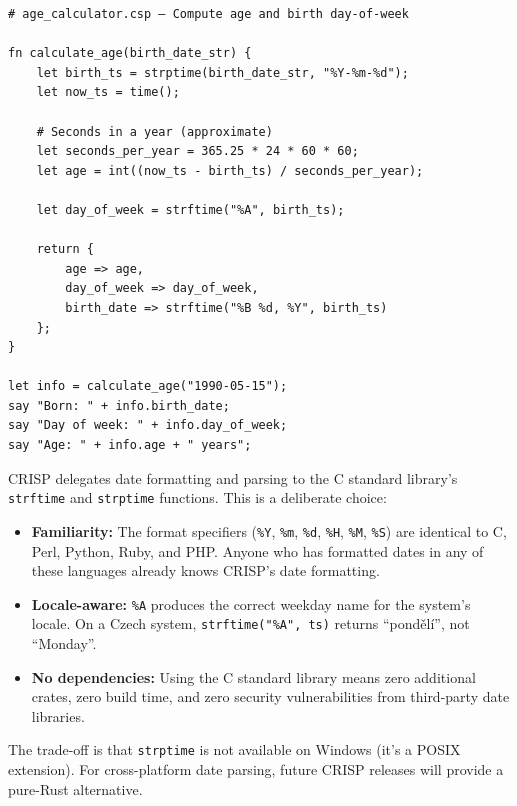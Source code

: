 \begin{tcolorbox}[colback=codebg, colframe=darkpurple, colbacktitle=darkpurple, title=\textbf{\textcolor{codegold}{Date Arithmetic (age\_calculator.csp)}}, fonttitle=\bfseries, sharp corners]
\begin{lstlisting}
# age_calculator.csp — Compute age and birth day-of-week

fn calculate_age(birth_date_str) {
    let birth_ts = strptime(birth_date_str, "%Y-%m-%d");
    let now_ts = time();

    # Seconds in a year (approximate)
    let seconds_per_year = 365.25 * 24 * 60 * 60;
    let age = int((now_ts - birth_ts) / seconds_per_year);

    let day_of_week = strftime("%A", birth_ts);

    return {
        age => age,
        day_of_week => day_of_week,
        birth_date => strftime("%B %d, %Y", birth_ts)
    };
}

let info = calculate_age("1990-05-15");
say "Born: " + info.birth_date;
say "Day of week: " + info.day_of_week;
say "Age: " + info.age + " years";
\end{lstlisting}
\end{tcolorbox}

\begin{tcolorbox}[colback=lightlavender, colframe=softvioletdark, title=\textbf{\textcolor{darkpurple}{Design Note: Why strftime/strptime?}}, fonttitle=\bfseries, sharp corners]
CRISP delegates date formatting and parsing to the C standard library's \texttt{strftime} and \texttt{strptime} functions. This is a deliberate choice:

\begin{itemize}
    \item \textbf{Familiarity:} The format specifiers (\texttt{\%Y}, \texttt{\%m}, \texttt{\%d}, \texttt{\%H}, \texttt{\%M}, \texttt{\%S}) are identical to C, Perl, Python, Ruby, and PHP. Anyone who has formatted dates in any of these languages already knows CRISP's date formatting.
    \item \textbf{Locale-aware:} \texttt{\%A} produces the correct weekday name for the system's locale. On a Czech system, \texttt{strftime("\%A", ts)} returns ``pondělí'', not ``Monday''.
    \item \textbf{No dependencies:} Using the C standard library means zero additional crates, zero build time, and zero security vulnerabilities from third-party date libraries.
\end{itemize}

The trade-off is that \texttt{strptime} is not available on Windows (it's a POSIX extension). For cross-platform date parsing, future CRISP releases will provide a pure-Rust alternative.
\end{tcolorbox}
